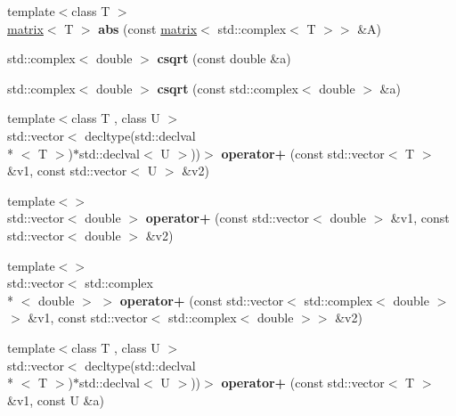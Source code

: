 \begin{DoxyCompactItemize}
\item 
\hypertarget{namespacekeycpp_ae0edec63f48a81c576da0c0ffc768af9}{{\footnotesize template$<$class T $>$ }\\\hyperlink{classkeycpp_1_1matrix}{matrix}$<$ T $>$ {\bfseries abs} (const \hyperlink{classkeycpp_1_1matrix}{matrix}$<$ std\-::complex$<$ T $>$$>$ \&A)}\label{namespacekeycpp_ae0edec63f48a81c576da0c0ffc768af9}

\item 
\hypertarget{namespacekeycpp_a952e5296774667c3be4e792b5cd980da}{std\-::complex$<$ double $>$ {\bfseries csqrt} (const double \&a)}\label{namespacekeycpp_a952e5296774667c3be4e792b5cd980da}

\item 
\hypertarget{namespacekeycpp_a8faa7912f1f198c5185cb6a36cfd2fb2}{std\-::complex$<$ double $>$ {\bfseries csqrt} (const std\-::complex$<$ double $>$ \&a)}\label{namespacekeycpp_a8faa7912f1f198c5185cb6a36cfd2fb2}

\item 
\hypertarget{namespacekeycpp_a4da6882977b2262f8d6f080b0eaf60c5}{{\footnotesize template$<$class T , class U $>$ }\\std\-::vector$<$ decltype(std\-::declval\\*
$<$ T $>$)$\ast$std\-::declval$<$ U $>$))$>$ {\bfseries operator+} (const std\-::vector$<$ T $>$ \&v1, const std\-::vector$<$ U $>$ \&v2)}\label{namespacekeycpp_a4da6882977b2262f8d6f080b0eaf60c5}

\item 
\hypertarget{namespacekeycpp_aa299ed6dd4f0a895be84e9e0076ba96e}{{\footnotesize template$<$$>$ }\\std\-::vector$<$ double $>$ {\bfseries operator+} (const std\-::vector$<$ double $>$ \&v1, const std\-::vector$<$ double $>$ \&v2)}\label{namespacekeycpp_aa299ed6dd4f0a895be84e9e0076ba96e}

\item 
\hypertarget{namespacekeycpp_a98ef889b03caf6eef0e989b2dcd2e5f6}{{\footnotesize template$<$$>$ }\\std\-::vector$<$ std\-::complex\\*
$<$ double $>$ $>$ {\bfseries operator+} (const std\-::vector$<$ std\-::complex$<$ double $>$$>$ \&v1, const std\-::vector$<$ std\-::complex$<$ double $>$$>$ \&v2)}\label{namespacekeycpp_a98ef889b03caf6eef0e989b2dcd2e5f6}

\item 
\hypertarget{namespacekeycpp_a1c1cd804c6f704b7a9124a9d9a82c325}{{\footnotesize template$<$class T , class U $>$ }\\std\-::vector$<$ decltype(std\-::declval\\*
$<$ T $>$)$\ast$std\-::declval$<$ U $>$))$>$ {\bfseries operator+} (const std\-::vector$<$ T $>$ \&v1, const U \&a)}\label{namespacekeycpp_a1c1cd804c6f704b7a9124a9d9a82c325}


\end{DoxyCompactItemize}
